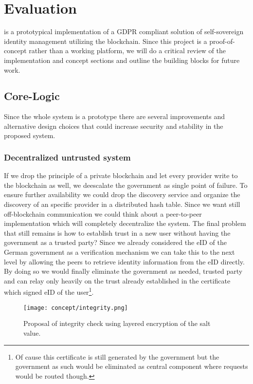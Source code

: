 \chapter{Evaluation}
\label{cha:evaluation}

\projectName{} is a prototypical implementation of a GDPR compliant solution of self-sovereign identity management utilizing the blockchain. Since this project is a proof-of-concept rather than a working platform, we will do a critical review of the implementation and concept sections and outline the building blocks for future work.

\section{Core-Logic}
\label{sec:coreLogicEval}
Since the whole system is a prototype there are several improvements and alternative design choices that could increase security and stability in the proposed system.

\subsection{Decentralized untrusted system}
\label{sec:untrustedSystem}
If we drop the principle of a private blockchain and let every provider write to the blockchain as well, we deescalate the government as single point of failure. To ensure further availability we could drop the discovery service and organize the discovery of an specific provider in a distributed hash table. Since we want still off-blockchain communication we could think about a peer-to-peer implementation which will completely decentralize the system. The final problem that still remains is how to establish trust in a new user without having the government as a trusted party? Since we already considered the eID of the German government as a verification mechanism we can take this to the next level by allowing the peers to retrieve identity information from the eID directly. By doing so we would finally eliminate the government as needed, trusted party and can relay only heavily on the trust already established in the certificate which signed eID of the user\footnote{Of cause this certificate is still generated by the government but the government as such would be eliminated as central component where requests would be routed though.}.

\begin{figure}
\texttt{[image: concept/integrity.png]}
\centering
\caption{Proposal of integrity check using layered encryption of the salt value.}
\label{fig:integrity}
\end{figure}

